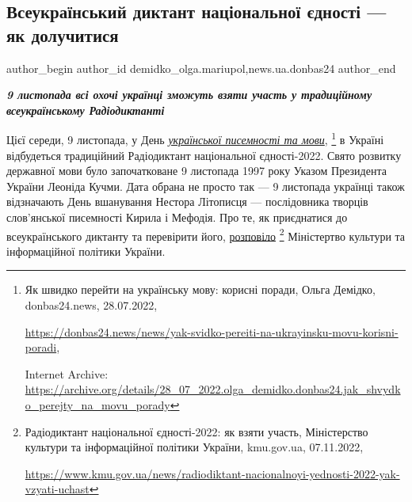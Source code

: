  
 
 
 
 
 
\subsection{Всеукраїнський диктант національної єдності — як долучитися}
\label{sec:08_11_2022.stz.news.ua.donbas24.1.vseukr_dyktant_jednosti_jak_doluchytys}
 
\ifcmt
 author_begin
   author_id demidko_olga.mariupol,news.ua.donbas24
 author_end
\fi

\begin{center}
  \em\color{blue}\bfseries\Large
9 листопада всі охочі українці зможуть взяти участь у традиційному всеукраїнському Радіодиктанті
\end{center}

Цієї середи, 9 листопада, у День \href{https://archive.org/details/28_07_2022.olga_demidko.donbas24.jak_shvydko_perejty_na_movu_porady}{\emph{української писемності та мови}},
\footnote{Як швидко перейти на українську мову: корисні поради, Ольга Демідко, donbas24.news, 28.07.2022, \par%
\url{https://donbas24.news/news/yak-svidko-pereiti-na-ukrayinsku-movu-korisni-poradi}, \par%
Internet Archive: \url{https://archive.org/details/28_07_2022.olga_demidko.donbas24.jak_shvydko_perejty_na_movu_porady}%
} в Україні відбудеться традиційний Радіодиктант національної єдності-2022. Свято розвитку
державної мови було започатковане 9 листопада 1997 року Указом Президента
України Леоніда Кучми. Дата обрана не просто так — 9 листопада українці також
відзначають День вшанування Нестора Літописця — послідовника творців
слов'янської писемності Кирила і Мефодія. Про те, як приєднатися до
всеукраїнського диктанту та перевірити його, \href{https://www.kmu.gov.ua/news/radiodiktant-nacionalnoyi-yednosti-2022-yak-vzyati-uchast}{розповіло}%
\footnote{Радіодиктант національної єдності-2022: як взяти участь, Міністерство культури та інформаційної політики України, kmu.gov.ua, 07.11.2022, \par\url{https://www.kmu.gov.ua/news/radiodiktant-nacionalnoyi-yednosti-2022-yak-vzyati-uchast}}
Міністертво культури та інформаційної політики України.

